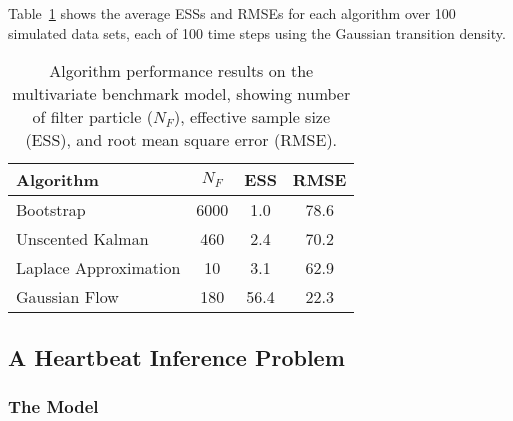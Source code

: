 \documentclass[12pt]{article}
\begin{document}
Table~\ref{tab:drone_results_gaussian} shows the average ESSs and RMSEs for each algorithm over 100 simulated data sets, each of 100 time steps using the Gaussian transition density.
%
\begin{table}
\centering
\begin{tabular}{l||c|c|c}
Algorithm                                & $N_F$ & ESS  & RMSE \\
\hline
Bootstrap                                &  6000 &  1.0 & 78.6 \\
Unscented Kalman                         &   460 &  2.4 & 70.2 \\
Laplace Approximation                    &    10 &  3.1 & 62.9 \\
Gaussian Flow                            &   180 & 56.4 & 22.3 \\
\end{tabular}
\caption{Algorithm performance results on the multivariate benchmark model, showing number of filter particle ($N_F$), effective sample size (ESS), and root mean square error (RMSE).}
\label{tab:drone_results_gaussian}
\end{table}



\subsection{A Heartbeat Inference Problem}

\subsubsection{The Model}
\end{document}
